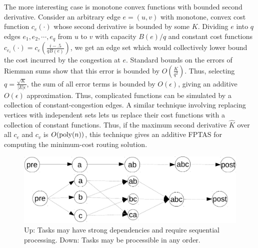 
The more interesting case is monotone convex functions with bounded second derivative. Consider an arbitrary edge $e = (u,v)$ with monotone, convex cost function $c_e(\cdot)$ whose second derivative is bounded by some $K$. Dividing $e$ into $q$ edges $e_1, e_2, \cdots, e_q$ from $u$ to $v$ with capacity $B(e)/q$ and constant cost functions $c_{e_i}(\cdot) = c_e\left(\tfrac{i-.5}{q B(e)}\right)$, we get an edge set which would collectively lower bound the cost incurred by the congestion at $e$. Standard bounds on the errors of Riemman sums show that this error is bounded by $O\left(\tfrac{K}{q^2}\right)$. Thus, selecting $q = \tfrac{\sqrt{K}}{|E|\epsilon}$, the sum of all error terms is bounded by $O(\epsilon)$, giving an additive $O(\epsilon)$ approximation. Thus, complicated functions can be simulated by a collection of constant-congestion edges. A similar technique involving replacing vertices with independent sets lets us replace their cost functions with a collection of constant functions. Thus, if the maximum second derivative $\hat{K}$ over all $c_e$ and $c_v$ is $O(\operatorname{poly}(n))$, this technique gives an additive FPTAS for computing the minimum-cost routing solution.

\begin{figure}
	\centering
 \includegraphics[width=.8\linewidth]{images/task.pdf}
 \caption{Up: Tasks may have strong dependencies and require sequential processing. Down: Tasks may be processible in any order.}
\end{figure}

